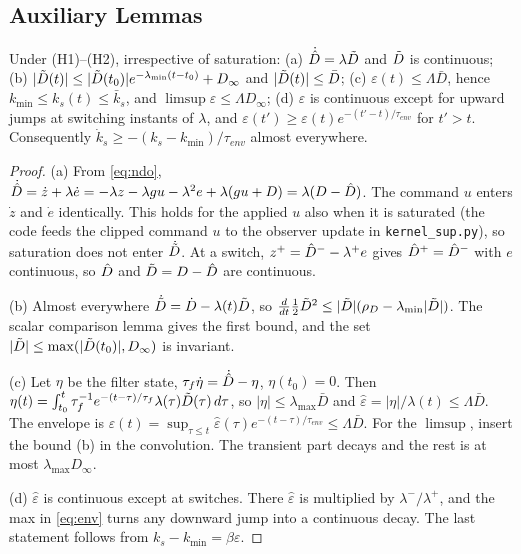 \subsection{Auxiliary Lemmas}\label{ap:lemmas}

\begin{lemma}\label{lem:ndo}
Under (H1)--(H2), irrespective of saturation: (a) $\dot{\hat{D}}=\lambda\tilde{D}$ and $\tilde{D}$ is continuous; (b) $|\tilde{D}(t)|\le|\tilde{D}(t_0)|e^{-\lambda_{\min}(t-t_0)}+D_\infty$ and $|\tilde{D}(t)|\le\bar D$; (c) $\varepsilon(t)\le\Lambda\bar D$, hence $k_{\min}\le k_s(t)\le\bar k_s$, and $\limsup\varepsilon\le\Lambda D_\infty$; (d) $\varepsilon$ is continuous except for upward jumps at switching instants of $\lambda$, and $\varepsilon(t')\ge\varepsilon(t)e^{-(t'-t)/\tau_{env}}$ for $t'>t$. Consequently $\dot k_s\ge-(k_s-k_{\min})/\tau_{env}$ almost everywhere.
\end{lemma}
\begin{proof}
(a) From \eqref{eq:ndo}, $\dot{\hat{D}}=\dot z+\lambda\dot e=-\lambda z-\lambda gu-\lambda^2e+\lambda(gu+D)=\lambda(D-\hat{D})$. The command $u$ enters $\dot z$ and $\dot e$ identically. This holds for the applied $u$ also when it is saturated (the code feeds the clipped command $u$ to the observer update in \texttt{kernel\_sup.py}), so saturation does not enter $\dot{\tilde{D}}$. At a switch, $z^+=\hat{D}^--\lambda^+e$ gives $\hat{D}^+=\hat{D}^-$ with $e$ continuous, so $\hat{D}$ and $\tilde{D}=D-\hat{D}$ are continuous.

(b) Almost everywhere $\dot{\tilde{D}}=\dot D-\lambda(t)\tilde{D}$, so $\tfrac{d}{dt}\tfrac12\tilde{D}^2\le|\tilde{D}|(\rho_D-\lambda_{\min}|\tilde{D}|)$. The scalar comparison lemma gives the first bound, and the set $|\tilde{D}|\le\max(|\tilde{D}(t_0)|,D_\infty)$ is invariant.

(c) Let $\eta$ be the filter state, $\tau_f\dot\eta=\dot{\hat{D}}-\eta$, $\eta(t_0)=0$. Then $\eta(t)=\int_{t_0}^t\tau_f^{-1}e^{-(t-\tau)/\tau_f}\lambda(\tau)\tilde{D}(\tau)\,d\tau$, so $|\eta|\le\lambda_{\max}\bar D$ and $\hat\varepsilon=|\eta|/\lambda(t)\le\Lambda\bar D$. The envelope is $\varepsilon(t)=\sup_{\tau\le t}\hat\varepsilon(\tau)e^{-(t-\tau)/\tau_{env}}\le\Lambda\bar D$. For the $\limsup$, insert the bound (b) in the convolution. The transient part decays and the rest is at most $\lambda_{\max}D_\infty$.

(d) $\hat\varepsilon$ is continuous except at switches. There $\hat\varepsilon$ is multiplied by $\lambda^-/\lambda^+$, and the max in \eqref{eq:env} turns any downward jump into a continuous decay. The last statement follows from $k_s-k_{\min}=\beta\varepsilon$.
\end{proof}

